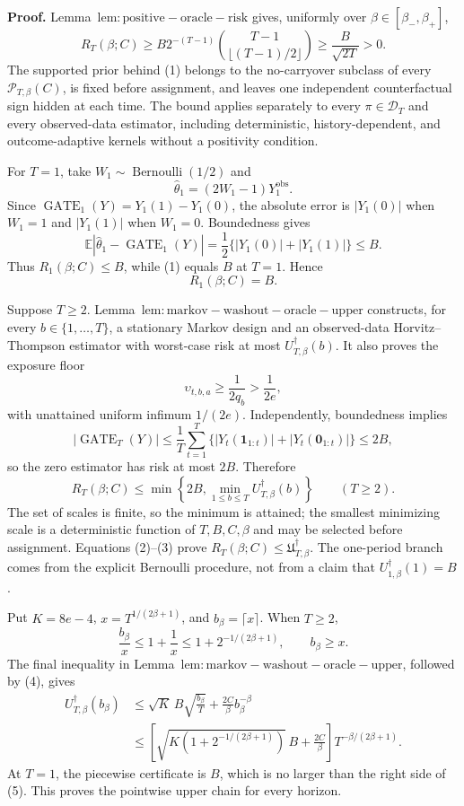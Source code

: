 \textbf{Proof.} Lemma~\(\mathrm{lem:positive-oracle-risk}\) gives, uniformly over \(\beta\in[\beta_-,\beta_+]\),
\[
R_T(\beta;C)
\ge B2^{-(T-1)}\binom{T-1}{\lfloor(T-1)/2\rfloor}
\ge\frac{B}{\sqrt{2T}}>0.
\tag{1}
\]
The supported prior behind (1) belongs to the no-carryover subclass of every \(\mathcal P_{T,\beta}(C)\), is fixed before assignment, and leaves one independent counterfactual sign hidden at each time. The bound applies separately to every \(\pi\in\mathcal D_T\) and every observed-data estimator, including deterministic, history-dependent, and outcome-adaptive kernels without a positivity condition.

For \(T=1\), take \(W_1\sim\operatorname{Bernoulli}(1/2)\) and
\[
\widehat\theta_1=(2W_1-1)Y_1^{\mathrm{obs}}.
\]
Since \(\operatorname{GATE}_1(Y)=Y_1(1)-Y_1(0)\), the absolute error is \(|Y_1(0)|\) when \(W_1=1\) and \(|Y_1(1)|\) when \(W_1=0\). Boundedness gives
\[
\mathbb E|\widehat\theta_1-\operatorname{GATE}_1(Y)|
=\frac12\{|Y_1(0)|+|Y_1(1)|\}\le B.
\]
Thus \(R_1(\beta;C)\le B\), while (1) equals \(B\) at \(T=1\). Hence
\[
R_1(\beta;C)=B.
\tag{2}
\]

Suppose \(T\ge2\). Lemma~\(\mathrm{lem:markov-washout-oracle-upper}\) constructs, for every \(b\in\{1,\ldots,T\}\), a stationary Markov design and an observed-data Horvitz--Thompson estimator with worst-case risk at most \(U_{T,\beta}^{\dagger}(b)\). It also proves the exposure floor
\[
\upsilon_{t,b,a}\ge\frac{1}{2q_b}>\frac{1}{2e},
\]
with unattained uniform infimum \(1/(2e)\). Independently, boundedness implies
\[
|\operatorname{GATE}_T(Y)|
\le\frac1T\sum_{t=1}^T\{|Y_t(\mathbf1_{1:t})|+|Y_t(\mathbf0_{1:t})|\}
\le2B,
\]
so the zero estimator has risk at most \(2B\). Therefore
\[
R_T(\beta;C)
\le\min\left\{2B,\min_{1\le b\le T}U_{T,\beta}^{\dagger}(b)\right\}
\qquad(T\ge2).
\tag{3}
\]
The set of scales is finite, so the minimum is attained; the smallest minimizing scale is a deterministic function of \(T,B,C,\beta\) and may be selected before assignment. Equations (2)--(3) prove \(R_T(\beta;C)\le\mathfrak U_{T,\beta}^{\dagger}\). The one-period branch comes from the explicit Bernoulli procedure, not from a claim that \(U_{1,\beta}^{\dagger}(1)=B\).

Put \(K=8e-4\), \(x=T^{1/(2\beta+1)}\), and \(b_\beta=\lceil x\rceil\). When \(T\ge2\),
\[
\frac{b_\beta}{x}\le1+\frac1x\le1+2^{-1/(2\beta+1)},
\qquad
b_\beta\ge x.
\tag{4}
\]
The final inequality in Lemma~\(\mathrm{lem:markov-washout-oracle-upper}\), followed by (4), gives
\[
\begin{aligned}
U_{T,\beta}^{\dagger}(b_\beta)
&\le\sqrt K\,B\sqrt{\frac{b_\beta}{T}}+\frac{2C}{\beta}b_\beta^{-\beta}\\
&\le\left[\sqrt{K\left(1+2^{-1/(2\beta+1)}\right)}\,B+\frac{2C}{\beta}\right]T^{-\beta/(2\beta+1)}.
\end{aligned}
\tag{5}
\]
At \(T=1\), the piecewise certificate is \(B\), which is no larger than the right side of (5). This proves the pointwise upper chain for every horizon.

